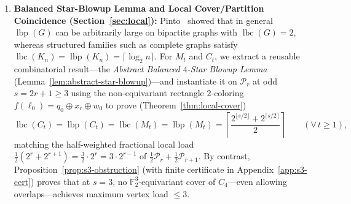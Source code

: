 \documentclass[11pt,reqno]{amsart}
\theoremstyle{definition}
\theoremstyle{remark}
\DeclareMathOperator{\lbc}{lbc}
\DeclareMathOperator{\lbp}{lbp}
\newcommand{\FF}{\mathbb{F}}
\numberwithin{equation}{section}
\begin{document}
\begin{enumerate}[leftmargin=2em,label=\textbf{(\arabic*)}]
  \item \textbf{Balanced Star-Blowup Lemma and Local Cover/Partition Coincidence (Section~\ref{sec:local}):}
  Pinto~\cite{Pin14} showed that in general $\lbp(G)$ can be arbitrarily large on bipartite graphs with $\lbc(G) = 2$, whereas structured families such as complete graphs satisfy $\lbc(K_n) = \lbp(K_n) = \lceil \log_2 n \rceil$. For $M_t$ and $C_t$, we extract a reusable combinatorial result---the \emph{Abstract Balanced $4$-Star Blowup Lemma} (Lemma~\ref{lem:abstract-star-blowup})---and instantiate it on $\mathcal{P}_r$ at odd $s = 2r + 1 \ge 3$ using the non-equivariant rectangle $2$-coloring $f(\ell_0) = q_0 \oplus x_r \oplus w_0$ to prove (Theorem~\ref{thm:local-cover})
  \[
    \lbc(C_t) = \lbp(C_t) = \lbc(M_t) = \lbp(M_t) = \left\lceil \frac{2^{\lfloor s/2 \rfloor} + 2^{\lceil s/2 \rceil}}{2} \right\rceil \qquad (\forall\, t \ge 1),
  \]
  matching the half-weighted fractional local load $\frac{1}{2}(2^r + 2^{r+1}) = \frac{3}{2}\cdot 2^r = 3 \cdot 2^{r-1}$ of $\frac{1}{2}\mathcal{P}_r + \frac{1}{2}\mathcal{P}_{r+1}$. By contrast, Proposition~\ref{prop:s3-obstruction} (with finite certificate in Appendix~\ref{app:s3-cert}) proves that at $s = 3$, no $\FF_2^3$-equivariant cover of $C_4$---even allowing overlaps---achieves maximum vertex load $\le 3$.


\end{enumerate}
\end{document}
